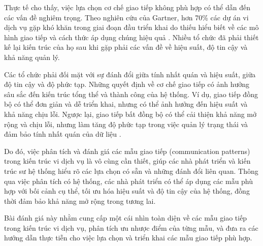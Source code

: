 Thực tế cho thấy, việc lựa chọn cơ chế giao tiếp không phù hợp có thể dẫn đến
các vấn đề nghiêm trọng. Theo nghiên cứu của Gartner, hơn 70\% các dự án
vi dịch vụ gặp khó khăn trong giai đoạn đầu triển khai do thiếu hiểu biết về
các mô hình giao tiếp và cách thức áp dụng chúng hiệu quả \cite{gartner2019}. Nhiều tổ chức đã
phải thiết kế lại kiến trúc của họ sau khi gặp phải các vấn đề về hiệu suất, độ
tin cậy và khả năng quản lý.

Các tổ chức phải đối mặt với sự đánh đổi giữa tính nhất quán và hiệu suất, giữa
độ tin cậy và độ phức tạp. Những quyết định về cơ chế giao tiếp có ảnh hưởng
sâu sắc đến kiến trúc tổng thể và thành công của hệ thống. Ví dụ, giao tiếp
đồng bộ có thể đơn giản và dễ triển khai, nhưng có thể ảnh hưởng đến hiệu suất
và khả năng chịu lỗi. Ngược lại, giao tiếp bất đồng bộ có thể cải thiện khả
năng mở rộng và chịu lỗi, nhưng làm tăng độ phức tạp trong việc quản lý trạng
thái và đảm bảo tính nhất quán của dữ liệu \cite{newman2015}.

Do đó, việc phân tích và đánh giá các mẫu giao tiếp (communication patterns)
trong kiến trúc vi dịch vụ là vô cùng cần thiết, giúp các nhà phát triển và
kiến trúc sư hệ thống hiểu rõ các lựa chọn có sẵn và những đánh đổi liên quan.
Thông qua việc phân tích có hệ thống, các nhà phát triển có thể áp dụng các mẫu
phù hợp với bối cảnh cụ thể, tối ưu hóa hiệu suất và độ tin cậy của hệ thống,
đồng thời đảm bảo khả năng mở rộng trong tương lai.

Bài đánh giá này nhằm cung cấp một cái nhìn toàn diện về các mẫu giao tiếp
trong kiến trúc vi dịch vụ, phân tích ưu nhược điểm của từng mẫu, và đưa ra
các hướng dẫn thực tiễn cho việc lựa chọn và triển khai các mẫu giao tiếp phù
hợp.
